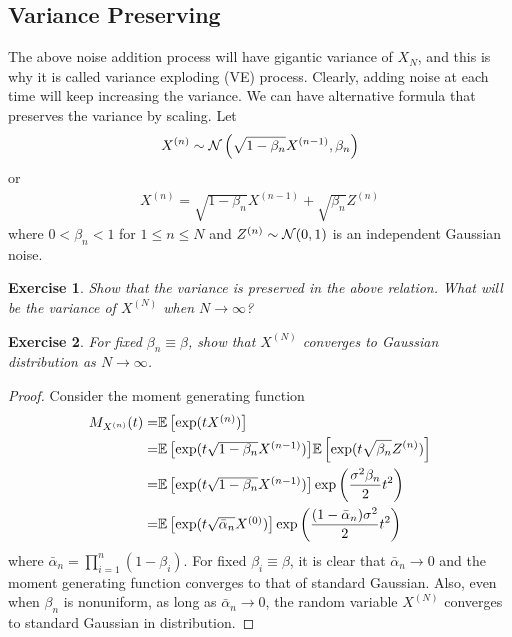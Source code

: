 \documentclass[11pt]{article}
\newtheorem{exercise}{Exercise}
\begin{document}
\subsection{Variance Preserving}
The above noise addition process will have gigantic variance of $X_N$,
and this is why it is called variance exploding (VE) process.
Clearly, adding noise at each time will keep increasing the variance.
We can have alternative formula that preserves the variance by scaling.
Let
\begin{align}
    X^{(n)} \sim {\cal N}\left(\sqrt{1-\beta_n} X^{(n-1)},\beta_n \right)
\end{align}
or 
\begin{align}
    X^{(n)} = \sqrt{1-\beta_n} X^{(n-1)} + \sqrt{\beta_n }Z^{(n)}
\end{align}
where $0<\beta_n<1$ for $1\leq n\leq N$ and $Z^{(n)}\sim{\cal N}(0, 1)$ is an independent Gaussian noise.

\begin{exercise}
    Show that the variance is preserved in the above relation.
    What will be the variance of $X^{(N)}$ when $N\rightarrow \infty$?
\end{exercise}

\begin{exercise}
    For fixed $\beta_n\equiv \beta$, show that $X^{(N)}$ converges to Gaussian distribution as $N\rightarrow \infty$.
\end{exercise}
\begin{proof}
    Consider the moment generating function
    \begin{align}
        M_{X^{(n)}}(t) =& \Expec{\exp(t X^{(n)})}\\
        =& \Expec{\exp(t \sqrt{1-\beta_n} X^{(n-1)})} \Expec{\exp(t \sqrt{\beta_n}Z^{(n)})}\\
        =& \Expec{\exp(t \sqrt{1-\beta_n}X^{(n-1)})} \exp\left(\frac{\sigma^2\beta_n}{2}t^2\right)\\
        =& \Expec{\exp(t \sqrt{\bar{\alpha}_n} X^{(0)})} \exp\left(\frac{(1-\bar{\alpha}_n)\sigma^2}{2}t^2\right)
    \end{align}
    where $\bar{\alpha}_n = \prod_{i=1}^n (1-\beta_i)$.
    For fixed $\beta_i\equiv \beta$, it is clear that $\bar{\alpha}_n \rightarrow 0$ and the moment generating function
    converges to that of standard Gaussian.
    Also, even when $\beta_n$ is nonuniform, as long as $\bar{\alpha}_n\rightarrow 0$, the random variable $X^{(N)}$ converges to standard Gaussian in distribution.
\end{proof}
\end{document}
